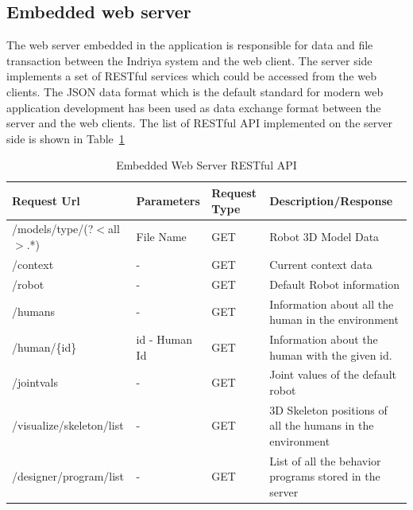 \subsection*{Embedded web server}
The web server embedded in the application is responsible for data and file transaction between the Indriya system and the web client. The server side implements a set of RESTful services which could be accessed from the web clients. The JSON data format which is the default standard for modern web application development has been used as data exchange format between the server and the web clients. The list of RESTful API implemented on the server side is shown in Table~\ref{table:restful_api}
\begin{table}[H]
\centering
\small
\caption{Embedded Web Server RESTful API}
\label{table:restful_api}
\begin{tabular}{|l|p{2.8cm}|p{1.2cm}|p{5.5cm}|}
\hline
  \textbf{Request Url}  & \textbf{Parameters} & \textbf{Request Type} & \textbf{Description/Response}
  \tabularnewline \hline
  /models/{type}/(?$<$all$>$.*) & File Name & GET & Robot 3D Model Data
                                          \tabularnewline\hline
                                          
  /context  & - & GET & Current context data  
  										                    \tabularnewline\hline
  										 
  /robot  &  - & GET & Default Robot information  
  										                    \tabularnewline\hline										 
  
  /humans & - & GET  & Information about all the human in the environment  
                                          \tabularnewline\hline
                                          
  /human/\{id\} & id - Human Id & GET  & Information about the human with the given id.  
                                          \tabularnewline\hline
                                          
  /jointvals & - & GET  & Joint values of the default robot  
                                          \tabularnewline\hline
                                          
  /visualize/skeleton/list & - & GET  & 3D Skeleton positions of all the humans in the environment  
                                          \tabularnewline\hline                                        
       
  /designer/program/list & - & GET  & List of all the behavior programs stored in the server  
                                          \tabularnewline\hline                                                               
                                          

\end{tabular}
\end{table}
